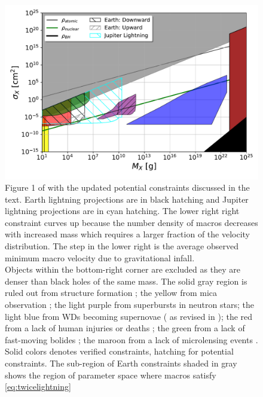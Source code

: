 \documentclass[%
 reprint,
 amsmath,amssymb,
 aps,
]{revtex4-2}
\newcommand{\vtwo}[1]{{\color{red} #1}}
\begin{document}


\begin{figure}
    \includegraphics[width=\textwidth]{lightning_constraints/lightningconstraints.pdf}
    \caption{
        Figure 1 of \vtwo{\citep{Sidhu2020reconsider}} with the updated \vtwo{potential} constraints discussed in the text. Earth lightning projections are in black hatching and Jupiter lightning projections are in cyan hatching. The lower right right constraint curves up because the number density of macros decreases with increased mass which requires a larger fraction of the velocity distribution. The step in the lower right is the average observed minimum macro velocity due to gravitational infall.
        \\
        Objects within the bottom-right corner are excluded as they are denser than black holes of the same mass. The {\color{gray} solid gray} region is ruled out from structure formation \vtwo{\citep{Wilkinson2014angular}}; the {\color{yellow} yellow} from mica observation \vtwo{\citep{DeRujula1984axn, Price1988ge}};  the light {\color{blue} purple} from superbursts in neutron stars; the {\color{cyan} light blue} from WDs becoming supernovae (\vtwo{\citet{Graham2018}} as revised in \vtwo{\citet{Sidhu2020reconsider}});  the {\color{red} red} from a lack of human injuries or deaths \vtwo{\citep{Sidhu2019death}}; the {\color{green} green} from a lack of fast-moving bolides \vtwo{\citep{Sidhu2019bolide}}; the {\color{purple} maroon} from a lack of microlensing events \vtwo{\citep{Niikura2019, Alcock2001, Tisserand2007, Carr2010, Griest2013}}. Solid colors denotes verified constraints, hatching for potential constraints.
        \vtwo{The sub-region of Earth constraints shaded in} {\color{gray} gray} \vtwo{shows the region of parameter space where macros satisfy \eqref{eq:twicelightning}}
    }\label{fig:constraints}
\end{figure}
\end{document}
